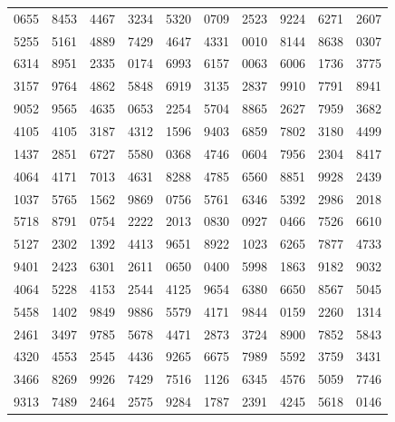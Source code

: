 \begin{figure}[!ht]
\centering
\setlength\arrayrulewidth{1pt}
\renewcommand{\arraystretch}{.9}
\begin{footnotesize}
\begin{tabular}{cccccccccc}
\hline
0655 & 8453 & 4467 & 3234 & 5320 & 0709 & 2523 & 9224 & 6271 & 2607 \\
\rowcolor{lightgray}5255 & 5161 & 4889 & 7429 & 4647 & 4331 & 0010 & 8144 & 8638 & 0307 \\
6314 & 8951 & 2335 & 0174 & 6993 & 6157 & 0063 & 6006 & 1736 & 3775 \\
\rowcolor{lightgray} 3157 & 9764 & 4862 & 5848 & 6919 & 3135 & 2837 & 9910 & 7791 & 8941 \\
9052 & 9565 & 4635 & 0653 & 2254 & 5704 & 8865 & 2627 & 7959 & 3682 \\
\hline
4105 & 4105 & 3187 & 4312 & 1596 & 9403 & 6859 & 7802 & 3180 & 4499 \\
\rowcolor{lightgray}1437 & 2851 & 6727 & 5580 & 0368 & 4746 & 0604 & 7956 & 2304 & 8417 \\
4064 & 4171 & 7013 & 4631 & 8288 & 4785 & 6560 & 8851 & 9928 & 2439 \\
\rowcolor{lightgray} 1037 & 5765 & 1562 & 9869 & 0756 & 5761 & 6346 & 5392 & 2986 & 2018 \\
5718 & 8791 & 0754 & 2222 & 2013 & 0830 & 0927 & 0466 & 7526 & 6610 \\
\hline
5127 & 2302 & 1392 & 4413 & 9651 & 8922 & 1023 & 6265 & 7877 & 4733 \\
\rowcolor{lightgray} 9401 & 2423 & 6301 & 2611 & 0650 & 0400 & 5998 & 1863 & 9182 & 9032 \\
4064 & 5228 & 4153 & 2544 & 4125 & 9654 & 6380 & 6650 & 8567 & 5045 \\
\rowcolor{lightgray} 5458 & 1402 & 9849 & 9886 & 5579 & 4171 & 9844 & 0159 & 2260 & 1314 \\
2461 & 3497 & 9785 & 5678 & 4471 & 2873 & 3724 & 8900 & 7852 & 5843 \\
\hline
4320 & 4553 & 2545 & 4436 & 9265 & 6675 & 7989 & 5592 & 3759 & 3431 \\
\rowcolor{lightgray} 3466 & 8269 & 9926 & 7429 & 7516 & 1126 & 6345 & 4576 & 5059 & 7746 \\
9313 & 7489 & 2464 & 2575 & 9284 & 1787 & 2391 & 4245 & 5618 & 0146 \\

\end{tabular}
\end{footnotesize}
\end{figure}
